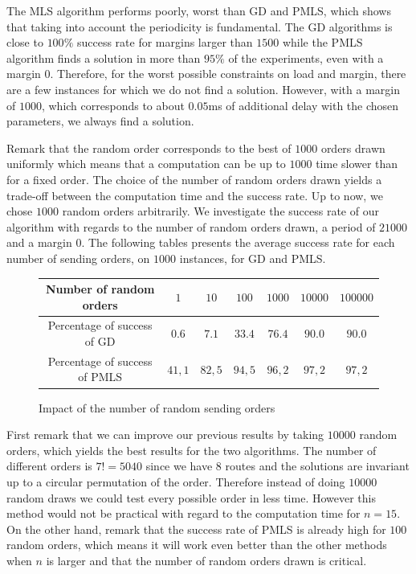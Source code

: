\documentclass[a4paper,10pt]{article}
\begin{document}
     The MLS algorithm performs poorly, worst than GD and PMLS, which shows that taking into account the periodicity is fundamental.
     The GD algorithms is close to $100\%$ success rate for margins larger than $1500$ while the PMLS algorithm finds a solution in more than $95\%$ of the experiments, even with a margin $0$. Therefore, for the worst possible constraints on load and margin, there are a few instances for which we do not find a solution. However, with a margin of $1000$, which corresponds to about $0.05$ms of additional delay with the chosen parameters, we always find a solution. 
     
    Remark that the random order corresponds to the best of $1000$ orders drawn uniformly which means that a computation can be up to $1000$ time slower than for a fixed order. The choice of the number of random orders drawn yields a trade-off between the computation time and the success rate. Up to now, we chose $1000$ random orders arbitrarily. We investigate the success rate of our algorithm with regards to the number of random orders drawn, a period of $21000$ and a margin $0$. The following tables presents the average success rate for each number of sending orders, on $1000$ instances, for GD and PMLS.

         \begin{figure}[H] 
       \begin{center}
   \begin{tabular}{|c|c|c|c|c|c|c|}
    \hline
    Number of random orders & $1$ & $10$ & $100$& $1 000$& $10 000$&$100 000$\\
    \hline
    Percentage of success of GD & $0.6$ &$7.1$&$33.4$&$76.4$&$90.0$&$90.0$\\
    \hline
    Percentage of success of PMLS & $41,1$ &$82,5$&$94,5$&$96,2$&$97,2$&$97,2$\\
    \hline
      \end{tabular}
      \end{center}
   \caption{Impact of the number of random sending orders}
     \end{figure}
     
First remark that we can improve our previous results by taking $10000$ random orders, which 
yields the best results for the two algorithms. The number of different orders is $7!= 5040$ since we have $8$ routes and the solutions are invariant up to a circular permutation of the order. Therefore instead of doing $10000$ random draws we could test every possible order in less time. However this method would not be practical with regard to the computation time for $n = 15$. On the other hand, remark that the success rate of PMLS is already high for $100$ random orders, which means it will work even better than the other methods when $n$ is larger and that the number of random orders drawn is critical.
     
\end{document}
